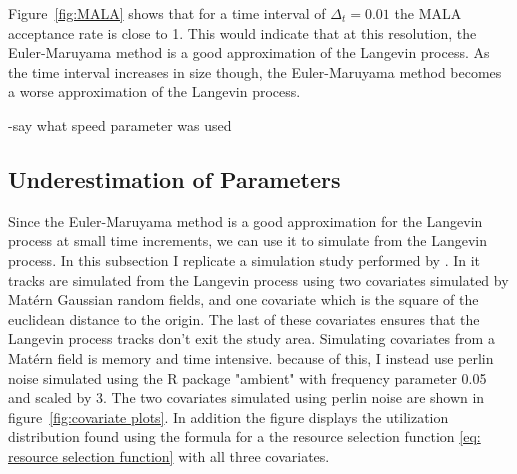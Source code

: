 Figure~\ref{fig:MALA} shows that for a time interval of $\Delta_t =0.01$ the MALA acceptance rate is close to 1. This would indicate that at this resolution, the Euler-Maruyama method is a good approximation of the Langevin process. As the time interval increases in size though, the Euler-Maruyama method becomes a worse approximation of the Langevin process.

-say what speed parameter was used

\subsection{Underestimation of Parameters}

Since the Euler-Maruyama method is a good approximation for the Langevin process at small time increments, we can use it to simulate from the Langevin process. In this subsection I replicate a simulation study performed by \parencite{michelot_langevin_2019}. In it tracks are simulated from the Langevin process using two covariates simulated by Matérn Gaussian random fields, and one covariate which is the square of the euclidean distance to the origin. The last of these covariates ensures that the Langevin process tracks don't exit the study area. Simulating covariates from a Matérn field is memory and time intensive. because of this, I instead use perlin noise simulated using the R package "ambient" with frequency parameter 0.05 and scaled by 3. The two covariates simulated using perlin noise are shown in figure~\ref{fig:covariate plots}. In addition the figure displays the utilization distribution found using the formula for a the resource selection function \eqref{eq: resource selection function} with all three covariates.


